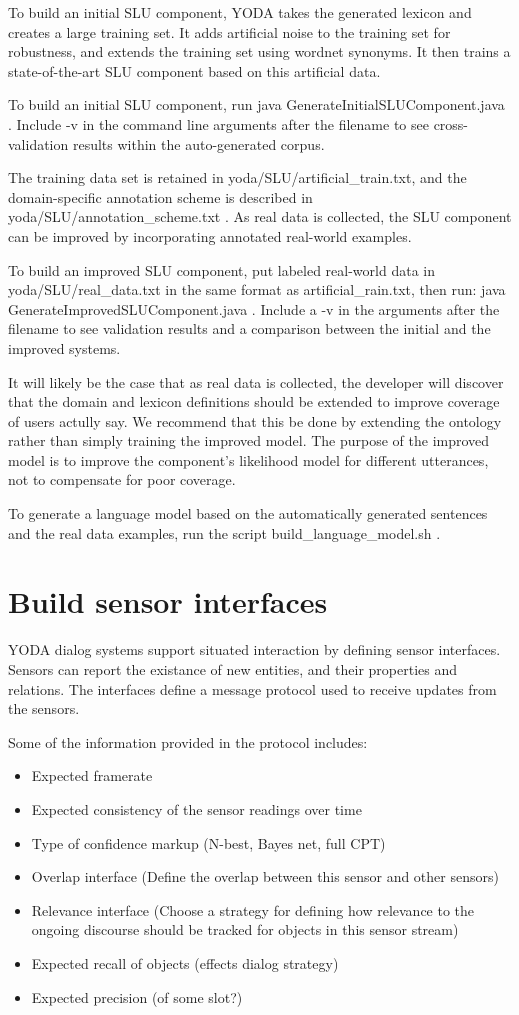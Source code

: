 \documentclass[10pt]{article}
\begin{document}
To build an initial SLU component, YODA takes the generated lexicon and creates a large training set.
It adds artificial noise to the training set for robustness, and extends the training set using wordnet synonyms.
It then trains a state-of-the-art SLU component based on this artificial data.

To build an initial SLU component, run java GenerateInitialSLUComponent.java .
Include -v in the command line arguments after the filename to see cross-validation results within the auto-generated corpus.

The training data set is retained in yoda/SLU/artificial\_train.txt, and the domain-specific annotation scheme is described in yoda/SLU/annotation\_scheme.txt .
As real data is collected, the SLU component can be improved by incorporating annotated real-world examples.

To build an improved SLU component, put labeled real-world data in yoda/SLU/real\_data.txt in the same format as artificial\_rain.txt, then run: java GenerateImprovedSLUComponent.java .
Include a -v in the arguments after the filename to see validation results and a comparison between the initial and the improved systems.

It will likely be the case that as real data is collected, the developer will discover that the domain and lexicon definitions should be extended to improve coverage of users actully say.
We recommend that this be done by extending the ontology rather than simply training the improved model.
The purpose of the improved model is to improve the component's likelihood model for different utterances, not to compensate for poor coverage.

To generate a language model based on the automatically generated sentences and the real data examples, run the script build\_language\_model.sh .


\section {Build sensor interfaces}
YODA dialog systems support situated interaction by defining sensor interfaces.
Sensors can report the existance of new entities, and their properties and relations.
The interfaces define a message protocol used to receive updates from the sensors.

Some of the information provided in the protocol includes:
\begin{itemize}
\item Expected framerate
\item Expected consistency of the sensor readings over time
\item Type of confidence markup (N-best, Bayes net, full CPT)
\item Overlap interface (Define the overlap between this sensor and other sensors)
\item Relevance interface (Choose a strategy for defining how relevance to the ongoing discourse should be tracked for objects in this sensor stream)
\item Expected recall of objects (effects dialog strategy)
\item Expected precision (of some slot?)
\end{itemize}
\end{document}
